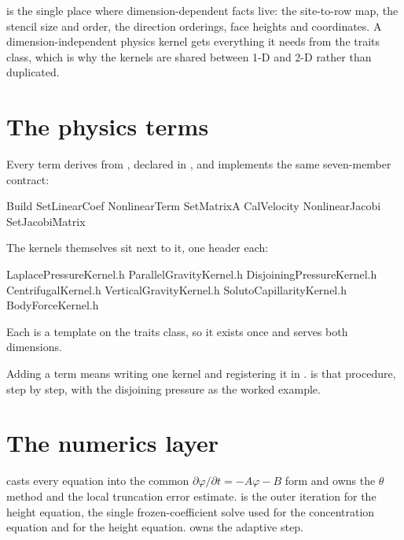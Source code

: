  is the single place where
dimension-dependent facts live: the site-to-row map, the stencil size and
order, the direction orderings, face heights and coordinates. A
dimension-independent physics kernel gets everything it needs from the traits
class, which is why the kernels are shared between 1-D and 2-D rather than
duplicated.

\section{The physics terms}
\label{sec:layout:terms}

Every term derives from , declared in
, and implements the same
seven-member contract:

\begin{plain}
Build             SetLinearCoef      NonlinearTerm
SetMatrixA        CalVelocity        NonlinearJacobi
SetJacobiMatrix
\end{plain}

The kernels themselves sit next to it, one header each:

\begin{plain}
LaplacePressureKernel.h     ParallelGravityKernel.h
DisjoiningPressureKernel.h  CentrifugalKernel.h
VerticalGravityKernel.h     SolutoCapillarityKernel.h
BodyForceKernel.h
\end{plain}

Each is a template on the traits class, so it exists once and serves both
dimensions.

Adding a term means writing one kernel and registering it in
.  is that procedure, step by
step, with the disjoining pressure as the worked example.

\section{The numerics layer}
\label{sec:layout:numerics}

 casts every equation into the common
$\partial\varphi/\partial t = -A\varphi - B$ form and owns the $\theta$ method
and the local truncation error estimate.  is the
outer iteration for the height equation,  the single
frozen-coefficient solve used for the concentration equation and for the
 height equation.  owns the adaptive step.

